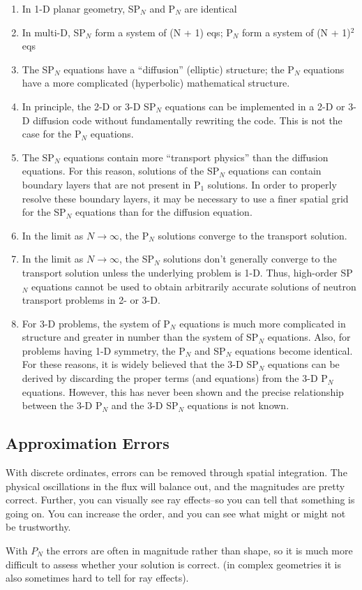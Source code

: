 \documentclass[12pt]{article}
\begin{document}
\begin{enumerate}
\item In 1-D planar geometry, SP$_N$ and P$_N$ are identical
\item In multi-D, SP$_N$ form a system of (N + 1) eqs; P$_N$ form a system of (N + 1)$^2$ eqs
\item The SP$_N$ equations have a ``diffusion'' (elliptic) structure; the P$_N$ equations have a more complicated (hyperbolic) mathematical structure.
\item In principle, the 2-D or 3-D SP$_N$ equations can be implemented in a 2-D or 3-D diffusion code without fundamentally rewriting the code.
This is not the case for the P$_N$ equations.
\item The SP$_N$ equations contain more ``transport physics'' than the diffusion equations.
For this reason, solutions of the SP$_N$ equations can contain boundary layers that are not present in P$_1$ solutions.
In order to properly resolve these boundary layers, it may be necessary to use a finer spatial grid for the SP$_N$ equations than for the diffusion equation.
\item In the limit as $N\rightarrow\infty$, the P$_N$ solutions converge to the transport solution.
\item In the limit as $N\rightarrow\infty$, the SP$_N$ solutions don't generally converge to the transport solution unless the underlying problem is 1-D.
Thus, high-order SP$_N$ equations cannot be used to obtain arbitrarily accurate solutions of neutron transport problems in 2- or 3-D.
\item For 3-D problems, the system of P$_N$ equations is much more complicated in structure and greater in number than the system of SP$_N$ equations.
Also, for problems having 1-D symmetry, the P$_N$ and SP$_N$ equations become identical.
For these reasons, it is widely believed that the 3-D SP$_N$ equations can be derived by discarding the proper terms (and equations) from the 3-D P$_N$ equations. However, this has never been shown and the precise relationship between the 3-D P$_N$ and the 3-D SP$_N$ equations is not known.
\end{enumerate}

\subsection*{Approximation Errors}

With discrete ordinates, errors can be removed through spatial integration. 
The physical oscillations in the flux will balance out, and the magnitudes are 
pretty correct. Further, you can visually see ray effects--so you can tell 
that something is going on. You can increase the order, and you can see what 
might or might not be trustworthy. 

With $P_N$ the errors are often in magnitude rather than shape, so it is much 
more difficult to assess whether your solution is correct. (in complex 
geometries it is also sometimes hard to tell for ray effects). 
\end{document}
